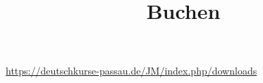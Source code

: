 \documentclass[a4paper]{article}
\title{Buchen}
\begin{document}
    \maketitle
    \url{https://deutschkurse-passau.de/JM/index.php/downloads}
\end{document}
